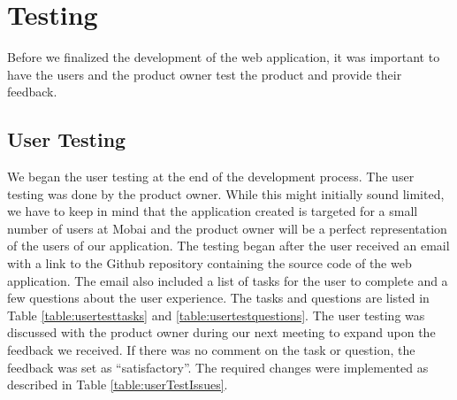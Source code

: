 \section{Testing}
\label{sec:testing}
Before we finalized the development of the web application, it was important to have the users and the product owner test the product and provide their feedback. 

\subsection{User Testing}
We began the user testing at the end of the development process. The user testing was done by the product owner. While this might initially sound limited, we have to keep in mind that the application created is targeted for a small number of users at Mobai and the product owner will be a perfect representation of the users of our application. The testing began after the user received an email with a link to the Github repository containing the source code of the web application. The email also included a list of tasks for the user to complete and a few questions about the user experience. The tasks and questions are listed in Table \ref{table:usertesttasks} and \ref{table:usertestquestions}. The user testing was discussed with the product owner during our next meeting to expand upon the feedback we received. If there was no comment on the task or question, the feedback was set as ``satisfactory''. The required changes were implemented as described in Table \ref{table:userTestIssues}.

\begin{table}[h]
\caption{Issues and solutions following the user testing.}
\label{table:userTestIssues}
\end{table}



